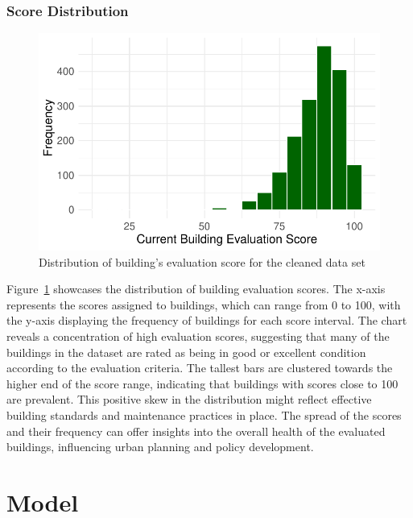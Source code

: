 \documentclass[
  letterpaper,
  DIV=11,
  numbers=noendperiod]{scrartcl}
\begin{document}
\hypertarget{score-distribution}{%
\subsubsection{Score Distribution}\label{score-distribution}}

\begin{figure}

{\centering \includegraphics{paper_files/figure-pdf/fig-score-distribution-1.pdf}

}

\caption{\label{fig-score-distribution}Distribution of building's
evaluation score for the cleaned data set}

\end{figure}

Figure~\ref{fig-score-distribution} showcases the distribution of
building evaluation scores. The x-axis represents the scores assigned to
buildings, which can range from 0 to 100, with the y-axis displaying the
frequency of buildings for each score interval. The chart reveals a
concentration of high evaluation scores, suggesting that many of the
buildings in the dataset are rated as being in good or excellent
condition according to the evaluation criteria. The tallest bars are
clustered towards the higher end of the score range, indicating that
buildings with scores close to 100 are prevalent. This positive skew in
the distribution might reflect effective building standards and
maintenance practices in place. The spread of the scores and their
frequency can offer insights into the overall health of the evaluated
buildings, influencing urban planning and policy development.

\hypertarget{sec-model}{%
\section{Model}\label{sec-model}}
\end{document}
